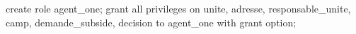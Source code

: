 create role agent_one;
grant all privileges
on unite, adresse, responsable_unite, camp, demande_subside, decision
to agent_one
with grant option;